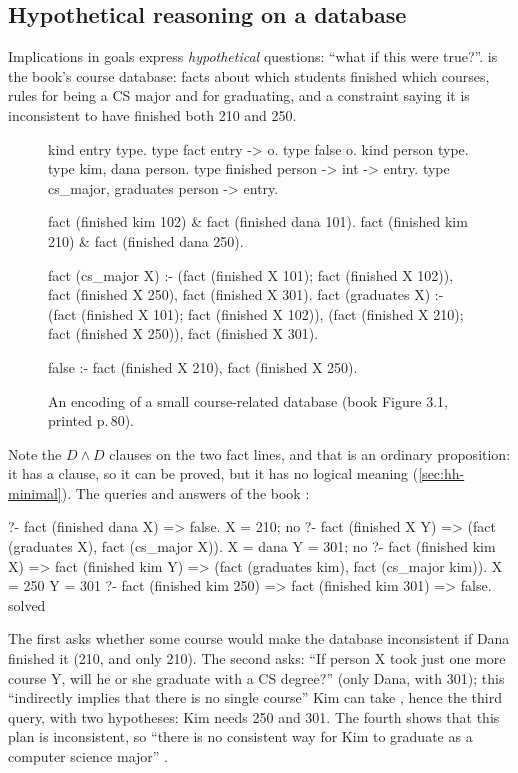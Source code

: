 {\subsection{Hypothetical reasoning on a database}\label{sec:hh-db}

Implications in goals express \emph{hypothetical} questions: ``what if this were true?''.
 is the book's course database: facts about which students finished which courses, rules
for being a CS major and for graduating, and a constraint saying it is inconsistent to have finished both
210 and 250.

\begin{figure}[t]
\begin{lprolog}
kind entry               type.
type fact                entry -> o.
type false               o.
kind person              type.
type kim, dana           person.
type finished            person -> int -> entry.
type cs_major, graduates person -> entry.

fact (finished kim  102) & fact (finished dana 101).
fact (finished kim  210) & fact (finished dana 250).

fact (cs_major X)  :-
     (fact (finished X 101); fact (finished X 102)),
     fact (finished X 250), fact (finished X 301).
fact (graduates X) :-
     (fact (finished X 101); fact (finished X 102)),
     (fact (finished X 210); fact (finished X 250)),
     fact (finished X 301).

false :- fact (finished X 210), fact (finished X 250).
\end{lprolog}
\caption{An encoding of a small course-related database (book Figure 3.1, printed p.\,80).}
\label{fig:hh-db}
\end{figure}

Note the $D\wedge D$ clauses on the two fact lines, and that  is an ordinary proposition: it
has a clause, so it can be proved, but it has no logical meaning (\cref{sec:hh-minimal}). The queries
and answers of the book :
\begin{lprolog}
?- fact (finished dana X) => false.
X = 210;
no
?- fact (finished X Y) => (fact (graduates X), fact (cs_major X)).
X = dana
Y = 301;
no
?- fact (finished kim X) => fact (finished kim Y) =>
               (fact (graduates kim), fact (cs_major kim)).
X = 250
Y = 301
?- fact (finished kim 250) => fact (finished kim 301) => false.
solved
\end{lprolog}
The first asks whether some course would make the database inconsistent if Dana finished it (210, and
only 210). The second asks: ``If person X took just one more course Y, will he or she graduate with a CS
degree?'' (only Dana, with 301); this ``indirectly implies that there is no single course'' Kim can take
, hence the third query, with two hypotheses: Kim needs 250 and 301. The fourth shows that this
plan is inconsistent, so ``there is no consistent way for Kim to graduate as a computer science major''
.

}
